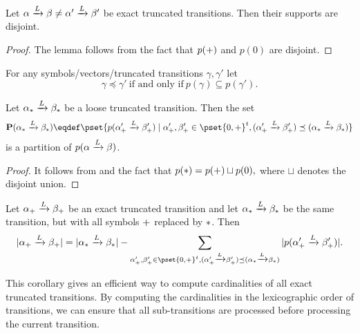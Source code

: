 \begin{lemma}
Let $\alpha \xrightarrow{L} \beta\ne\alpha' \xrightarrow{L} \beta'$ be exact truncated transitions. Then their supports are disjoint.
\end{lemma}
\begin{proof}
The lemma follows from the fact that $p(+)$ and $p(0)$ are disjoint. 
\end{proof}

\begin{definition}
For any symbols/vectors/truncated transitions $\gamma,\gamma'$ let
$$
\gamma \preceq \gamma' ~\text{if and only if}~ p(\gamma) \subseteq p(\gamma').
$$
\end{definition}

\begin{lemma}
Let $\alpha_{*} \xrightarrow{L} \beta_{*}$ be a loose truncated transition. Then the set
$$
\mathbf{P}(\alphabetalo) \eqdef \pset{
p(\alphabetaexp) \mid
\alpha_{\exact}',\beta_{\exact}' \in \pset{0,\exact}^t,
(\alphabetaexp) \preceq (\alphabetalo)
}
$$
is a partition of $p(\alpha \xrightarrow{L} \beta)$.
\end{lemma}
\begin{proof}
It follows from  and the fact that $
p(*) = p(+) \sqcup p(0),
$
where $\sqcup$ denotes the disjoint union. 
\end{proof}

\begin{corollary}
Let $\alpha_{+} \xrightarrow{L} \beta_{+}$ be an exact truncated transition and let $\alpha_{*} \xrightarrow{L} \beta_{*}$ be the same transition, but with all symbols $+$ replaced by $*$. Then
$$
|\alphabetaex| = |\alphabetalo| - \sum_{
\alpha_{\exact}',\beta_{\exact}' \in \pset{0,\exact}^t,
(\alphabetaexp) \preceq (\alphabetalo)
}
|p(\alphabetaexp)|.
$$
\end{corollary}

This corollary gives an efficient way to compute cardinalities of all exact truncated transitions. By computing the cardinalities in the lexicographic order of transitions, we can ensure that all sub-transitions are processed before processing the current transition.

